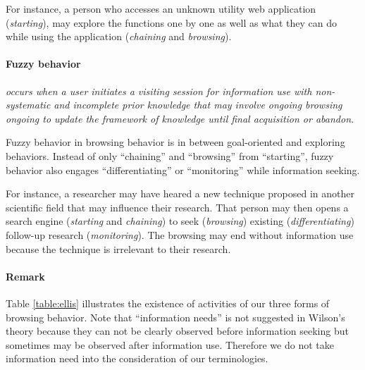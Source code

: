 For instance, a person who accesses an unknown utility web application (\emph{starting}), 
may explore the functions one by one as well as 
what they can do while using the application (\emph{chaining} and \emph{browsing}).

\paragraph{Fuzzy behavior} \emph{occurs when a user initiates a visiting session for information use
with non-systematic and incomplete prior knowledge that may involve ongoing browsing ongoing to update 
the framework of knowledge until final acquisition or abandon.}

Fuzzy behavior in browsing behavior is in between goal-oriented and exploring behaviors.
Instead of only ``chaining'' and ``browsing'' from ``starting'', fuzzy behavior also engages
``differentiating'' or ``monitoring'' while information seeking.

For instance, a researcher may have heared a new technique proposed in another scientific field 
that may influence their research. That person may then 
opens a search engine (\emph{starting} and \emph{chaining}) to seek (\emph{browsing}) 
existing (\emph{differentiating}) follow-up research (\emph{monitoring}). 
The browsing may end without information use because the technique is irrelevant 
to their research.

\paragraph{Remark} Table \ref{table:ellis} illustrates the existence of activities of our three
forms of browsing behavior. 
Note that ``information needs'' is not suggested in Wilson's theory \cite{wilson1981user} 
because they can not be clearly observed before information seeking but sometimes
may be observed after information use. Therefore we do not take information need into the 
consideration of our terminologies.

